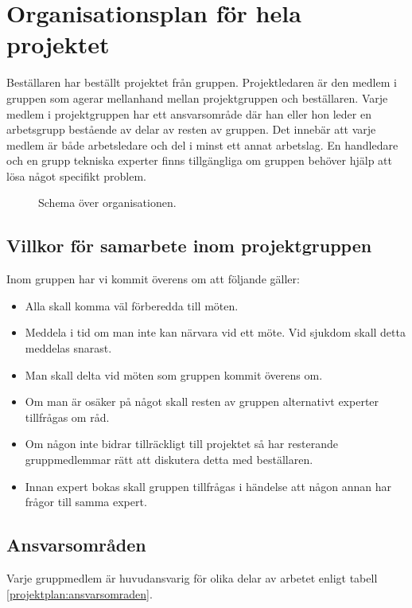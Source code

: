 \section{Organisationsplan för hela projektet}
Beställaren har beställt projektet från gruppen. Projektledaren är den medlem i gruppen som agerar mellanhand mellan projektgruppen och beställaren. Varje medlem i projektgruppen har ett ansvarsområde där han eller hon leder en arbetsgrupp bestående av delar av resten av gruppen. Det innebär att varje medlem är både arbetsledare och del i minst ett annat arbetslag. En handledare och en grupp tekniska experter finns tillgängliga om gruppen behöver hjälp att lösa något specifikt problem.

\begin{figure}[h!]
%

%
\caption{Schema över organisationen.}
\end{figure}

\subsection{Villkor för samarbete inom projektgruppen}
Inom gruppen har vi kommit överens om att följande gäller:
\begin{itemize}
\item{Alla skall komma väl förberedda till möten.}
\item{Meddela i tid om man inte kan närvara vid ett möte. Vid sjukdom skall detta meddelas snarast.}
\item{Man skall delta vid möten som gruppen kommit överens om.}
\item{Om man är osäker på något skall resten av gruppen alternativt experter tillfrågas om råd.}
\item{Om någon inte bidrar tillräckligt till projektet så har resterande gruppmedlemmar rätt att diskutera detta med beställaren.}
\item{Innan expert bokas skall gruppen tillfrågas i händelse att någon annan har frågor till samma expert.}
\end{itemize}

\subsection{Ansvarsområden}
Varje gruppmedlem är huvudansvarig för olika delar av arbetet enligt tabell \ref{projektplan:ansvarsomraden}.

